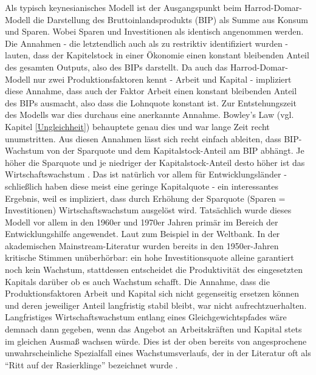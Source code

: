 Als typisch keynesianisches Modell ist der Ausgangspunkt beim Harrod-Domar-Modell die Darstellung des Bruttoinlandsprodukts (BIP) als Summe aus Konsum und Sparen. Wobei Sparen und Investitionen als identisch angenommen werden. Die Annahmen - die letztendlich auch als zu restriktiv identifiziert wurden - lauten, dass der Kapitelstock in einer Ökonomie einen konstant bleibenden Anteil des gesamten Outputs, also des BIPs darstellt. Da auch das Harrod-Domar-Modell nur zwei Produktionsfaktoren kennt - Arbeit und Kapital - impliziert diese Annahme, dass auch der Faktor Arbeit einen konstant bleibenden Anteil des BIPs ausmacht, also dass die Lohnquote konstant ist. Zur Entstehungszeit des Modells war dies durchaus eine anerkannte Annahme. Bowley's Law (vgl. Kapitel \ref{Ungleichheit}) behauptete genau dies und war lange Zeit recht unumstritten. Aus diesen Annahmen lässt sich recht einfach ableiten, dass BIP-Wachstum von der Sparquote und dem Kapitalstock-Anteil am BIP abhängt. Je höher die Sparquote und je niedriger der Kapitalstock-Anteil desto höher ist das Wirtschaftswachstum \parencite[S. 601]{Snowdon2005}. Das ist natürlich vor allem für Entwicklungsländer - schließlich haben diese meist eine geringe Kapitalquote - ein interessantes Ergebnis, weil es impliziert, dass durch Erhöhung der Sparquote (Sparen = Investitionen) Wirtschaftswachstum ausgelöst wird. Tatsächlich wurde dieses Modell vor allem in den 1960er und 1970er Jahren primär im Bereich der Entwicklungshilfe angewendet. Laut \textcite[S. 601]{Snowdon2005} zum Beispiel in der Weltbank. In der akademischen Mainstream-Literatur wurden bereits in den 1950er-Jahren kritische Stimmen unüberhörbar: ein hohe Investitionsquote alleine garantiert noch kein Wachstum, stattdessen entscheidet die Produktivität des eingesetzten Kapitals darüber ob es auch Wachstum schafft. Die Annahme, dass die Produktionsfaktoren Arbeit und Kapital sich nicht gegenseitig ersetzen können und deren jeweiliger Anteil langfristig stabil bleibt, war nicht aufrechtzuerhalten. Langfristiges Wirtschaftswachstum entlang eines Gleichgewichtspfades wäre demnach dann gegeben, wenn das Angebot an Arbeitskräften und Kapital stets im gleichen Ausmaß wachsen würde. Dies ist der oben bereits von \textcite{Solow1987} angesprochene unwahrscheinliche Spezialfall eines Wachstumsverlaufs, der in der Literatur oft als "`Ritt auf der Rasierklinge"' \parencite[S. 65]{Solow1956} bezeichnet wurde \parencite[S. 602]{Snowdon2005}.

